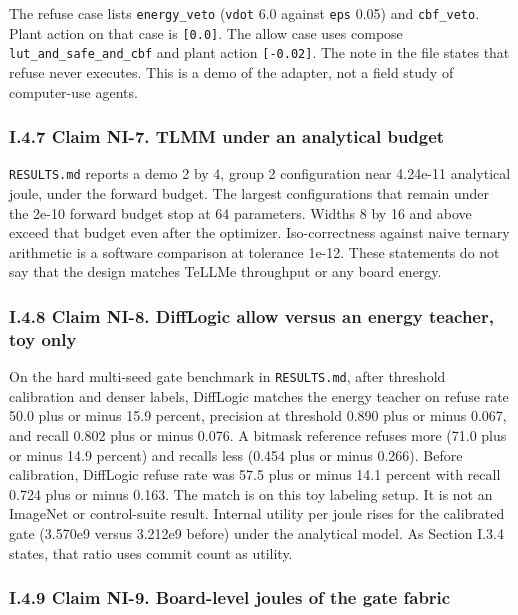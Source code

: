 \documentclass[
  10pt,
]{article}
\begin{document}
The refuse case lists \texttt{energy\_veto} (\texttt{vdot} 6.0 against
\texttt{eps} 0.05) and \texttt{cbf\_veto}. Plant action on that case is
\texttt{{[}0.0{]}}. The allow case uses compose
\texttt{lut\_and\_safe\_and\_cbf} and plant action \texttt{{[}-0.02{]}}.
The note in the file states that refuse never executes. This is a demo
of the adapter, not a field study of computer-use agents.

\subsubsection{I.4.7 Claim NI-7. TLMM under an analytical
budget}\label{i.4.7-claim-ni-7.-tlmm-under-an-analytical-budget}

\texttt{RESULTS.md} reports a demo 2 by 4, group 2 configuration near
4.24e-11 analytical joule, under the forward budget. The largest
configurations that remain under the 2e-10 forward budget stop at 64
parameters. Widths 8 by 16 and above exceed that budget even after the
optimizer. Iso-correctness against naive ternary arithmetic is a
software comparison at tolerance 1e-12. These statements do not say that
the design matches TeLLMe throughput or any board energy.

\subsubsection{I.4.8 Claim NI-8. DiffLogic allow versus an energy
teacher, toy
only}\label{i.4.8-claim-ni-8.-difflogic-allow-versus-an-energy-teacher-toy-only}

On the hard multi-seed gate benchmark in \texttt{RESULTS.md}, after
threshold calibration and denser labels, DiffLogic matches the energy
teacher on refuse rate 50.0 plus or minus 15.9 percent, precision at
threshold 0.890 plus or minus 0.067, and recall 0.802 plus or minus
0.076. A bitmask reference refuses more (71.0 plus or minus 14.9
percent) and recalls less (0.454 plus or minus 0.266). Before
calibration, DiffLogic refuse rate was 57.5 plus or minus 14.1 percent
with recall 0.724 plus or minus 0.163. The match is on this toy labeling
setup. It is not an ImageNet or control-suite result. Internal utility
per joule rises for the calibrated gate (3.570e9 versus 3.212e9 before)
under the analytical model. As Section I.3.4 states, that ratio uses
commit count as utility.

\subsubsection{I.4.9 Claim NI-9. Board-level joules of the gate
fabric}\label{i.4.9-claim-ni-9.-board-level-joules-of-the-gate-fabric}
\end{document}
